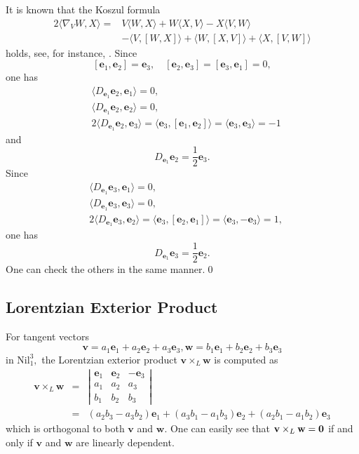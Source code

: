 \documentclass[11pt]{amsart}
\begin{document}
\noindent[Proof] It is known that the Koszul formula
\[
\begin{split}
2\langle \nabla_V W,X\rangle
={} &V\langle W,X\rangle + W \langle X,V\rangle - X\langle V,W\rangle\\
&-\langle V,[W,X]\rangle+\langle W,[X,V]\rangle+\langle
X,[V,W]\rangle
\end{split}
\]
holds, see, for instance, \cite{O}. Since
\[
[{\mathbf{e}}_1,{\mathbf{e}}_2]={\mathbf{e}}_3,\quad [{\mathbf{e}}_2,{\mathbf{e}}_3]=[{\mathbf{e}}_3,{\mathbf{e}}_1]=0,
\]
one has
\[
\begin{split}
&\langle D_{{\mathbf{e}}_1}{\mathbf{e}}_2,{\mathbf{e}}_1\rangle=0,\\
&\langle D_{{\mathbf{e}}_1}{\mathbf{e}}_2,{\mathbf{e}}_2\rangle=0,\\
&2\langle D_{{\mathbf{e}}_1}{\mathbf{e}}_2,{\mathbf{e}}_3\rangle
=\langle{\mathbf{e}}_3,[{\mathbf{e}}_1,{\mathbf{e}}_2]\rangle
=\langle{\mathbf{e}}_3,{\mathbf{e}}_3\rangle=-1
\end{split}
\]
and
\[
D_{{\mathbf{e}}_1}{\mathbf{e}}_2=\frac12 {\mathbf{e}}_3.
\]
Since
\[
\begin{split}
&\langle D_{{\mathbf{e}}_1}{\mathbf{e}}_3,{\mathbf{e}}_1\rangle=0,\\
&\langle D_{{\mathbf{e}}_1}{\mathbf{e}}_3,{\mathbf{e}}_3\rangle=0,\\
&2\langle D_{{\mathbf{e}}_1}{\mathbf{e}}_3,{\mathbf{e}}_2\rangle
=\langle{\mathbf{e}}_3,[{\mathbf{e}}_2,{\mathbf{e}}_1]\rangle
=\langle{\mathbf{e}}_3,-{\mathbf{e}}_3\rangle=1,
\end{split}
\]
one has
\[
D_{{\mathbf{e}}_1}{\mathbf{e}}_3=\frac12 {\mathbf{e}}_2.
\]
One can check the others in the same manner.\qed

\subsection{Lorentzian Exterior Product}
For tangent vectors $${\mathbf{v}}=a_1{\mathbf{e}}_1+a_2{\mathbf{e}}_2+a_3{\mathbf{e}}_3,
{\mathbf{w}}=b_1{\mathbf{e}}_1+b_2{\mathbf{e}}_2+b_3{\mathbf{e}}_3$$ in $\text{Nil}_1^3,$ the
Lorentzian exterior product ${\mathbf{v}}\times_L{\mathbf{w}}$ is computed as
\begin{eqnarray*}
{\mathbf{v}}\times_L{\mathbf{w}}&=&\left|
\begin{array}{rrr}{\mathbf{e}}_1&{\mathbf{e}}_2&-{\mathbf{e}}_3\\a_1&a_2&a_3\\b_1&b_2&b_3\end{array}\right|\\
&=&(a_2b_3-a_3b_2){\mathbf{e}}_1+(a_3b_1-a_1b_3){\mathbf{e}}_2+(a_2b_1-a_1b_2){\mathbf{e}}_3
\end{eqnarray*}
which is orthogonal to both ${\mathbf{v}}$ and ${\mathbf{w}}.$ One can easily see
that ${\mathbf{v}}\times_L{\mathbf{w}}=\bf{0}$ if and only if ${\mathbf{v}}$ and ${\mathbf{w}}$
are linearly dependent.
\end{document}
